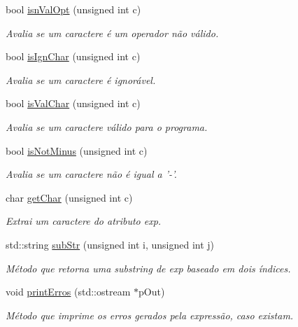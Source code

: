 \begin{DoxyCompactItemize}
bool \hyperlink{class_expressao_afb4109a0b03df89822e8ddd1adf23c5d}{isn\-Val\-Opt} (unsigned int c)
\begin{DoxyCompactList}\small\item\em Avalia se um caractere é um operador não válido. \end{DoxyCompactList}\item 
bool \hyperlink{class_expressao_ab3e99e5db4b2e7df65aff71895311359}{is\-Ign\-Char} (unsigned int c)
\begin{DoxyCompactList}\small\item\em Avalia se um caractere é ignorável. \end{DoxyCompactList}\item 
bool \hyperlink{class_expressao_a52c96971124d33b8b4268e6da14e8ca8}{is\-Val\-Char} (unsigned int c)
\begin{DoxyCompactList}\small\item\em Avalia se um caractere válido para o programa. \end{DoxyCompactList}\item 
bool \hyperlink{class_expressao_acf8915b3ca14cd0fc45bc57827486496}{is\-Not\-Minus} (unsigned int c)
\begin{DoxyCompactList}\small\item\em Avalia se um caractere não é igual a '-\/'. \end{DoxyCompactList}\item 
char \hyperlink{class_expressao_a587f25fab7f90ac3d3057065a2f2ea09}{get\-Char} (unsigned int c)
\begin{DoxyCompactList}\small\item\em Extrai um caractere do atributo exp. \end{DoxyCompactList}\item 
std\-::string \hyperlink{class_expressao_abdbb9a483991e82e37f794c3dc0b647a}{sub\-Str} (unsigned int i, unsigned int j)
\begin{DoxyCompactList}\small\item\em Método que retorna uma substring de exp baseado em dois índices. \end{DoxyCompactList}\item 
void \hyperlink{class_expressao_abee7466a912f23ddb5681b31641d50cb}{print\-Erros} (std\-::ostream $\ast$p\-Out)
\begin{DoxyCompactList}\small\item\em Método que imprime os erros gerados pela expressão, caso existam. \end{DoxyCompactList}\end{DoxyCompactItemize}
